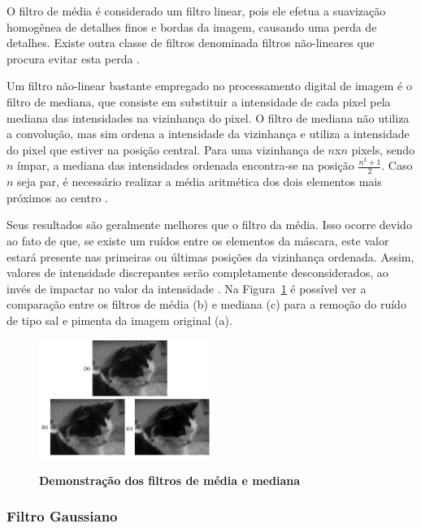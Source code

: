 \documentclass[12pt,oneside,a4paper,english,french,spanish,brazil,]{abntex2}
\begin{document}
O filtro de média é considerado um filtro linear, pois ele efetua a suavização homogênea de detalhes finos e bordas da imagem, causando uma perda de detalhes. Existe outra classe de filtros denominada filtros não-lineares que procura evitar esta perda \cite{pedrini:2008}.

Um filtro não-linear bastante empregado no processamento digital de imagem é o filtro de mediana, que consiste em substituir a intensidade de cada pixel pela mediana das intensidades na vizinhança do pixel. O filtro de mediana não utiliza a convolução, mas sim ordena a intensidade da vizinhança e utiliza a intensidade do pixel que estiver na posição central. Para uma vizinhança de \(n\)x\(n\) pixels, sendo \(n\) ímpar, a mediana das intensidades ordenada encontra-se na posição \(\frac{n^2+1}{2}\). Caso \(n\) seja par, é necessário realizar a média aritmética dos dois elementos mais próximos ao centro \cite{gonzalez:2012}. 

Seus resultados são geralmente melhores que o filtro da média. Isso ocorre devido ao fato de que, se existe um ruídos entre os elementos da máscara, este valor estará presente nas primeiras ou últimas posições da vizinhança ordenada. Assim, valores de intensidade discrepantes serão completamente desconsiderados, ao invés de impactar no valor da intensidade \cite{conci:2003}. Na Figura~\ref{fig:PDI_Media_Mediana} é possível ver a comparação entre os filtros de média (b) e mediana (c) para a remoção do ruído de tipo sal e pimenta da imagem original (a).

\begin{figure}[ht]
\centering
\caption{\textbf{ Demonstração dos filtros de média e mediana}}
\includegraphics[width=0.5\textwidth]{imagens/PDI_Media_Mediana.pdf}
\sourceAuthor
\label{fig:PDI_Media_Mediana}
\end{figure}

\subsubsection{Filtro Gaussiano}
\end{document}
